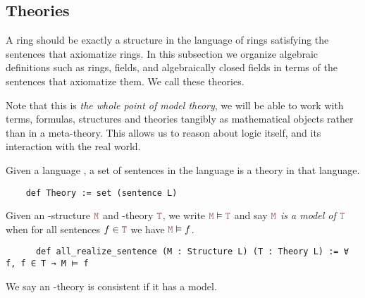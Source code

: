 \subsection{Theories}

A ring should be exactly a structure in the language of rings satisfying the
sentences that axiomatize rings.
In this subsection we organize algebraic definitions such as rings, fields,
and algebraically closed fields in terms of the sentences that axiomatize them.
We call these theories.

Note that this is \textit{the whole point of model theory},
we will be able to work with terms, formulas, structures and theories tangibly
as mathematical objects rather than in a meta-theory.
This allows us to reason about logic itself,
and its interaction with the real world.

\begin{dfn}
  Given a language ,
  a set of sentences in the language is a theory in that language.
  \begin{lstlisting}
    def Theory := set (sentence L)   \end{lstlisting}

    Given an -structure $\code{M}$ and -theory $\code{T}$,
    we write $\code{M} \vDash \code{T}$ and say
    \emph{$\code{M}$ is a model of $\code{T}$} when
    for all sentences $f \in \code{T}$ we have $\code{M} \vDash f$.

    \begin{lstlisting}
      def all_realize_sentence (M : Structure L) (T : Theory L) := ∀ f, f ∈ T → M ⊨ f \end{lstlisting}

    We say an -theory is consistent if it has a model.
  \end{dfn}

